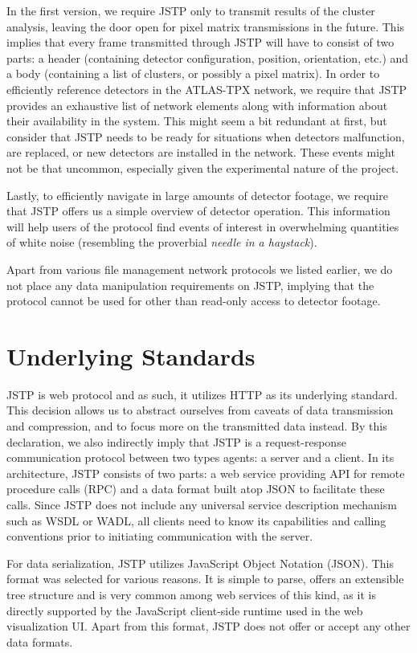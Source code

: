 In the first version, we require JSTP only to transmit results of the cluster analysis, leaving the door open for pixel matrix transmissions in the future. This implies that every frame transmitted through JSTP will have to consist of two parts: a header (containing detector configuration, position, orientation, etc.) and a body (containing a list of clusters, or possibly a pixel matrix). In order to efficiently reference detectors in the ATLAS-TPX network, we require that JSTP provides an exhaustive list of network elements along with information about their availability in the system. This might seem a bit redundant at first, but consider that JSTP needs to be ready for situations when detectors malfunction, are replaced, or new detectors are installed in the network. These events might not be that uncommon, especially given the experimental nature of the project.

Lastly, to efficiently navigate in large amounts of detector footage, we require that JSTP offers us a simple overview of detector operation. This information will help users of the protocol find events of interest in overwhelming quantities of white noise (resembling the proverbial \textit{needle in a haystack}).

Apart from various file management network protocols we listed earlier, we do not place any data manipulation requirements on JSTP, implying that the protocol cannot be used for other than read-only access to detector footage.

\section{Underlying Standards}
JSTP is web protocol and as such, it utilizes HTTP as its underlying standard. This decision allows us to abstract ourselves from caveats of data transmission and compression, and to focus more on the transmitted data instead. By this declaration, we also indirectly  imply that JSTP is a request-response communication protocol between two types agents: a server and a client. In its architecture, JSTP consists of two parts: a web service providing API for remote procedure calls (RPC) and a data format built atop JSON to facilitate these calls. Since JSTP does not include any universal service description mechanism such as WSDL or WADL, all clients need to know its capabilities and calling conventions prior to initiating communication with the server.

For data serialization, JSTP utilizes JavaScript Object Notation (JSON). This format was selected for various reasons. It is simple to parse, offers an extensible tree structure and is very common among web services of this kind, as it is directly supported by the JavaScript client-side runtime used in the web visualization UI. Apart from this format, JSTP does not offer or accept any other data formats.


